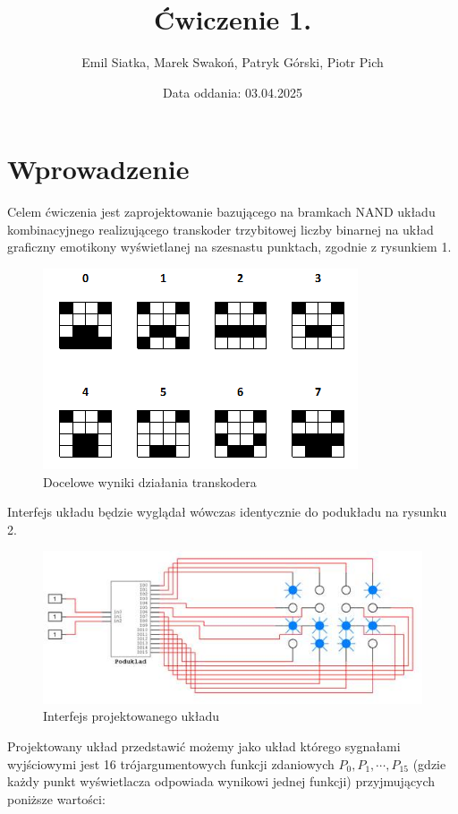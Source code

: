 \documentclass[11pt]{article}
\author{Emil Siatka, Marek Swakoń, Patryk Górski, Piotr Pich}
\date{Data oddania: 03.04.2025}
\title{Ćwiczenie 1.}
\begin{document}
\maketitle
\tableofcontents

\section{Wprowadzenie}
\label{sec:org91ad8a8}

Celem ćwiczenia jest zaprojektowanie bazującego na bramkach NAND układu kombinacyjnego
realizującego transkoder trzybitowej liczby binarnej na układ graficzny emotikony wyświetlanej na
szesnastu punktach, zgodnie z rysunkiem 1.

\begin{figure}[H]
\centering
\includegraphics[width=.9\linewidth]{rys1.png}
\caption{Docelowe wyniki działania transkodera}
\end{figure}

Interfejs układu będzie wyglądał wówczas identycznie do podukładu na rysunku 2.

\begin{figure}[H]
\centering
\includegraphics[width=.9\linewidth]{rys2.jpg}
\caption{Interfejs projektowanego układu}
\end{figure}

Projektowany układ przedstawić możemy jako układ którego sygnałami wyjściowymi jest 16 trójargumentowych funkcji zdaniowych \(P_0, P_1, \cdots, P_{15}\)
(gdzie każdy punkt wyświetlacza odpowiada wynikowi jednej funkcji) przyjmujących poniższe wartości:
\end{document}
